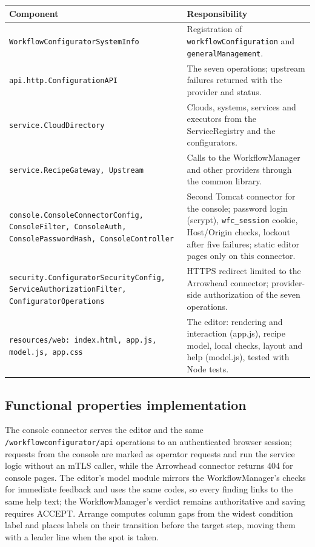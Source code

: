 \documentclass[a4paper]{arrowhead}
\begin{document}
{\small
\begin{longtable}{|p{6.2cm}|p{9.6cm}|}

\hline
\rowcolor{gray!33} Component & Responsibility \\ \hline
\endhead
{\footnotesize \texttt{WorkflowConfiguratorSystemInfo}} & Registration of \texttt{workflowConfiguration} and \texttt{generalManagement}. \\ \hline
{\footnotesize \texttt{api.\allowbreak{}http.\allowbreak{}ConfigurationAPI}} & The seven operations; upstream failures returned with the provider and status. \\ \hline
{\footnotesize \texttt{service.\allowbreak{}CloudDirectory}} & Clouds, systems, services and executors from the ServiceRegistry and the configurators. \\ \hline
{\footnotesize \texttt{service.\allowbreak{}RecipeGateway,\allowbreak{} Upstream}} & Calls to the WorkflowManager and other providers through the common library. \\ \hline
{\footnotesize \texttt{console.\allowbreak{}ConsoleConnectorConfig,\allowbreak{} ConsoleFilter,\allowbreak{} ConsoleAuth,\allowbreak{} ConsolePasswordHash,\allowbreak{} ConsoleController}} & Second Tomcat connector for the console; password login (scrypt), \texttt{wfc\_session} cookie, Host/Origin checks, lockout after five failures; static editor pages only on this connector. \\ \hline
{\footnotesize \texttt{security.\allowbreak{}ConfiguratorSecurityConfig,\allowbreak{} ServiceAuthorizationFilter,\allowbreak{} ConfiguratorOperations}} & HTTPS redirect limited to the Arrowhead connector; provider-side authorization of the seven operations. \\ \hline
{\footnotesize \texttt{resources/\allowbreak{}web: index.\allowbreak{}html,\allowbreak{} app.\allowbreak{}js,\allowbreak{} model.\allowbreak{}js,\allowbreak{} app.\allowbreak{}css}} & The editor: rendering and interaction (app.js), recipe model, local checks, layout and help (model.js), tested with Node tests. \\ \hline
\end{longtable}
}


\subsection{Functional properties implementation}
The console connector serves the editor and the same \texttt{/workflowconfigurator/api} operations to an
authenticated browser session; requests from the console are marked as operator requests and run the service logic
without an mTLS caller, while the Arrowhead connector returns 404 for console pages. The editor's model module mirrors
the WorkflowManager's checks for immediate feedback and uses the same codes, so every finding links to the same help
text; the WorkflowManager's verdict remains authoritative and saving requires ACCEPT. Arrange computes column gaps
from the widest condition label and places labels on their transition before the target step, moving them with a
leader line when the spot is taken.
\end{document}
